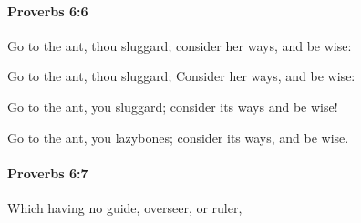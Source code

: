 		\paragraph{Proverbs 6:6} %
			\label{PROVERBS-6-6}

			Go to the ant, thou sluggard; consider her ways, and be wise:

			\begin{versebox}
					\item[BHS] 
					\item[ASV] Go to the ant, thou sluggard; Consider her ways, and be wise:
					\item[NIV] Go to the ant, you sluggard; consider its ways and be wise!
					\item[NRSV] Go to the ant, you lazybones; consider its ways, and be wise.
			\end{versebox}

		\paragraph{Proverbs 6:7} %
			\label{PROVERBS-6-7}

			Which having no guide, overseer, or ruler,

